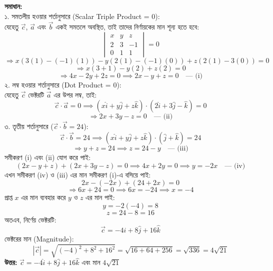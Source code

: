 \documentclass[12pt]{article}
\begin{document}
\begin{center}
\end{center}

\textbf{সমাধান:} \\
১. সমতলীয় হওয়ার শর্তানুসারে (Scalar Triple Product = 0): \\
যেহেতু $\vec{c}$, $\vec{a}$ এবং $\vec{b}$ একই সমতলে অবস্থিত, তাই তাদের নির্ণায়কের মান শূন্য হতে হবে:
$$\begin{vmatrix} x & y & z \\ 2 & 3 & -1 \\ 0 & 1 & 1 \end{vmatrix} = 0$$
$$\Rightarrow x(3(1) - (-1)(1)) - y(2(1) - (-1)(0)) + z(2(1) - 3(0)) = 0$$
$$\Rightarrow x(3 + 1) - y(2) + z(2) = 0$$
$$\Rightarrow 4x - 2y + 2z = 0 \implies 2x - y + z = 0 \quad \text{--- (i)}$$
২. লম্ব হওয়ার শর্তানুসারে (Dot Product = 0): \\
যেহেতু $\vec{c}$ ভেক্টরটি $\vec{a}$ এর উপর লম্ব, তাই:
$$\vec{c} \cdot \vec{a} = 0 \implies (x\hat{i} + y\hat{j} + z\hat{k}) \cdot (2\hat{i} + 3\hat{j} - \hat{k}) = 0$$
$$\Rightarrow 2x + 3y - z = 0 \quad \text{--- (ii)}$$
৩. তৃতীয় শর্তানুসারে ($\vec{c} \cdot \vec{b} = 24$):
$$\vec{c} \cdot \vec{b} = 24 \implies (x\hat{i} + y\hat{j} + z\hat{k}) \cdot (\hat{j} + \hat{k}) = 24$$
$$\Rightarrow y + z = 24 \implies z = 24 - y \quad \text{--- (iii)}$$
সমীকরণ (i) এবং (ii) যোগ করে পাই:
$$(2x - y + z) + (2x + 3y - z) = 0 \implies 4x + 2y = 0 \implies y = -2x \quad \text{--- (iv)}$$
এখন সমীকরণ (iv) ও (iii) এর মান সমীকরণ (i)-এ বসিয়ে পাই:
$$2x - (-2x) + (24 + 2x) = 0$$
$$\Rightarrow 6x + 24 = 0 \implies 6x = -24 \implies x = -4$$
প্রাপ্ত $x$ এর মান ব্যবহার করে $y$ ও $z$ এর মান পাই:
$$y = -2(-4) = 8$$
$$z = 24 - 8 = 16$$
অতএব, নির্ণেয় ভেক্টরটি:
$$\vec{c} = -4\hat{i} + 8\hat{j} + 16\hat{k}$$
ভেক্টরের মান (Magnitude):
$$|\vec{c}| = \sqrt{(-4)^2 + 8^2 + 16^2} = \sqrt{16 + 64 + 256} = \sqrt{336} = 4\sqrt{21}$$
\textbf{উত্তর:} $\vec{c} = -4\hat{i} + 8\hat{j} + 16\hat{k}$ এবং মান $4\sqrt{21}$
\end{document}
